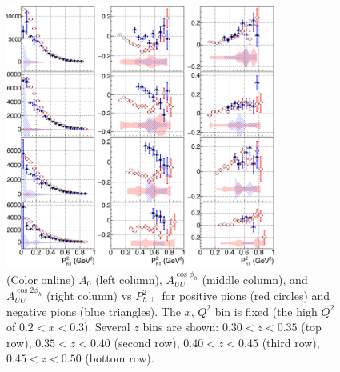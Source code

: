 \documentclass[aps,prl,twocolumn,showpacs,superscriptaddress,groupedaddress]{revtex4-1}  %
\begin{document}
\begin{figure}[htp]
\centering
\includegraphics[width=3.5in]{plots/A0AcAcc_zPT2bins_x1QQ1_final.png}
\caption{(Color online) $A_0$ (left column), $A_{UU}^{\cos\phi_h}$ (middle column), and $A_{UU}^{\cos 2\phi_h}$ (right column) vs $P_{h\perp}^2$ for positive pions (red circles) and negative pions (blue triangles). The $x$, $Q^2$ bin is fixed (the high $Q^2$ of $0.2 < x < 0.3$). Several $z$ bins are shown: $0.30 < z < 0.35$ (top row), $0.35 < z < 0.40$ (second row), $0.40 < z < 0.45$ (third row), $0.45 < z < 0.50$ (bottom row).}
\label{fig:A0AcAcc_zPT2bins_x1QQ1_final}
\end{figure}
%
%
\end{document}

